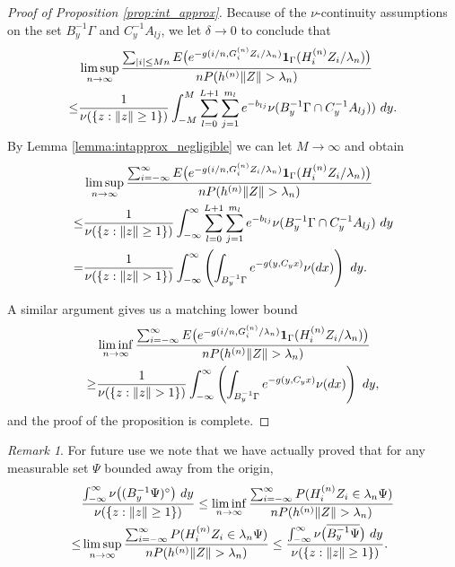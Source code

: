 \documentclass[11pt,reqno]{amsart}
\numberwithin{equation}{section}
\theoremstyle{definition}
\theoremstyle{remark}
\newtheorem{remark}{Remark}[section]
\theoremstyle{definition}
\newcommand{\one}{{\bf 1}}
\begin{document}
\begin{proof}[Proof of Proposition \ref{prop:int_approx}]
    
 Because of the $\nu$-continuity assumptions on the set $B_y^{-1} \Gamma$ and $C_y^{-1} A_{lj}$, we let $\delta\to 0$ to conclude that
    \begin{align*}
&  \limsup_{n\to\infty}  \frac{\sum_{|i|\leq Mn} E\bigl( e^{-g(i/n,
    G_i^{(n)} Z_i/\lambda_n)} \one_{\Gamma}(H_i^{(n)} Z_i/\lambda_n)\bigr) }
                     {n P(h^{(n)}\|Z\| > \lambda_n)}\\
   \leq&   \frac{1}{\nu(\{z: \|z\|\geq 1\})}
\int_{-M}^M \sum_{l=0}^{L+1}  \sum_{j=1}^{m_l}
      e^{-b_{lj}} \nu(B_{y}^{
      -1}\Gamma \cap C_y^{-1} A_{lj})) \ dy.
    \end{align*}
 By Lemma \ref{lemma:intapprox_negligible} we can let $M\to\infty$ and
 obtain 
    \begin{align*}
&  \limsup_{n\to\infty}  \frac{\sum_{i=-\infty}^\infty E\bigl( e^{-g(i/n,
    G_i^{(n)}Z_i/\lambda_n)} \one_{\Gamma}(H_i^{(n)} Z_i/\lambda_n)\bigr) }
                     {n P(h^{(n)}\|Z\| > \lambda_n)}\\
   \leq&   \frac{1}{\nu(\{z: \|z\|\geq 1\})}
\int_{-\infty}^\infty \sum_{l=0}^{L+1}  \sum_{j=1}^{m_l}
      e^{-b_{lj}}  \nu(B_{y}^{
      -1}\Gamma \cap C_y^{-1} A_{lj}) \ dy \\
=&      \frac{1}{\nu(\{z: \|z\|> 1\})}  \int_{-\infty}^\infty \left( 
\int_{B_y^{-1}\Gamma} e^{-g(y,C_yx)} \nu (dx)\right)\ dy.
    \end{align*}
 
A similar argument gives us a matching lower bound 
   \begin{align*}
&  \liminf_{n\to\infty}  \frac{\sum_{i=-\infty}^\infty E\bigl( e^{-g(i/n,
    G_i^{(n)}/\lambda_n)} \one_{\Gamma}(H_i^{(n)} Z_i/\lambda_n)\bigr) }
                     {n P(h^{(n)}\|Z\| > \lambda_n)}\\
\geq&      \frac{1}{\nu(\{z: \|z\|> 1\})}  \int_{-\infty}^\infty \left( 
\int_{B_y^{-1}\Gamma} e^{-g(y,C_yx)} \nu (dx)\right) \ dy, 
    \end{align*}
and the proof of the proposition is complete. 

\end{proof}
\begin{remark} \label{rk:prop1.gen}
For future use we note that we have actually proved that for any
measurable set $\Psi$ bounded away from the origin,
\begin{align} \label{e:less.prec.p1}
&\frac{\int_{-\infty}^\infty \nu\bigl((B_y^{-1}\Psi)^{\circ}\bigr)\
  dy}{\nu(\{z: \|z\| \geq 1\})} \leq  \liminf_{n\to \infty} \frac{
  \sum_{i= -\infty}^{\infty} {P({H_i^{(n)}} Z_i \in \lambda_n
    \Psi)}}{nP(h^{(n)}\|Z\|> \lambda_n)}\\
\notag \leq& \limsup_{n\to \infty} \frac{
  \sum_{i= -\infty}^{\infty} {P({H_i^{(n)}} Z_i \in \lambda_n
    \Psi)}}{nP(h^{(n)}\|Z\|> \lambda_n)}\leq
\frac{\int_{-\infty}^\infty \nu\bigl(\overline{B_y^{-1}\Psi}\bigr)\ 
  dy}{\nu(\{z: \|z\| \geq 1\})}. 
\end{align}

\end{remark}
\end{document}
